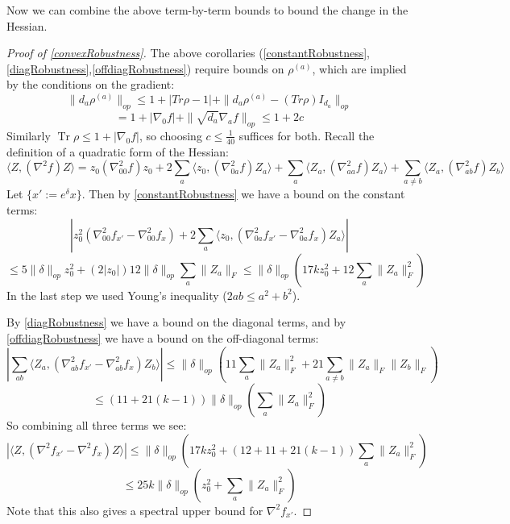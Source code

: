 \documentclass[aos]{imsart}
\theoremstyle{definition}
\numberwithin{equation}{section}
\DeclareMathOperator{\tr}{Tr}
\newcommand{\samp}{x}
\newcommand{\CF}[1]{{\color{purple}[CF: #1]}}
\newcommand{\AR}[1]{{\color{orange}[AR: #1]}}
\begin{document}
\begin{appendix}
Now we can combine the above term-by-term bounds to bound the change in the Hessian.

\begin{proof} [Proof of \cref{convexRobustness}]
The above corollaries (\ref{constantRobustness},\ref{diagRobustness},\ref{offdiagRobustness}) require bounds on $\rho^{(a)}$, which are implied by the conditions on the gradient:
\[ \|d_{a} \rho^{(a)}\|_{op} \leq 1 + |Tr \rho - 1| + \|d_{a} \rho^{(a)} - (Tr \rho) I_{d_{a}} \|_{op}    \]
\[ = 1 + |\nabla_{0} f| + \|\sqrt{d_{a}} \nabla_{a} f\|_{op} \leq 1 + 2c     \]
Similarly $\tr \rho \leq 1 + |\nabla_{0} f|$, so choosing $c \leq \frac{1}{40}$ suffices for both.
Recall the definition of a quadratic form of the Hessian:
\[ \langle Z, (\nabla^{2} f) Z \rangle = z_{0} (\nabla^{2}_{00} f) z_{0} + 2 \sum_{a} \langle z_{0}, (\nabla^{2}_{0a} f) Z_{a} \rangle + \sum_{a} \langle Z_{a}, (\nabla^{2}_{aa} f) Z_{a} \rangle + \sum_{a \neq b} \langle Z_{a}, (\nabla^{2}_{ab} f) Z_{b} \rangle     \]
Let $\{\samp' := e^{\delta} \samp\}$. Then by \cref{constantRobustness} we have a bound on the constant terms:
\[ | z_{0}^{2} (\nabla^{2}_{00} f_{\samp'} - \nabla^{2}_{00} f_{\samp} ) + 2 \sum_{a} \langle z_{0}, (\nabla^{2}_{0a} f_{\samp'} - \nabla^{2}_{0a} f_{\samp}) Z_{a} \rangle |      \]
\[ \leq 5 \|\delta\|_{op} z_{0}^{2} + (2 |z_{0}|) 12 \|\delta\|_{op} \sum_{a} \|Z_{a}\|_{F}
\leq \|\delta\|_{op} (17 k z_{0}^{2} + 12 \sum_{a} \|Z_{a}\|_{F}^{2})   \]
In the last step we used Young's inequality ($2ab \leq a^{2} + b^{2}$).

By \cref{diagRobustness} we have a bound on the diagonal terms, and by \cref{offdiagRobustness} we have a bound on the off-diagonal terms:
\[ |\sum_{ab} \langle Z_{a}, (\nabla^{2}_{ab} f_{\samp'} - \nabla^{2}_{ab} f_{\samp} ) Z_{b} \rangle | \leq \|\delta\|_{op} \left( 11 \sum_{a} \|Z_{a}\|_{F}^{2} + 21 \sum_{a \neq b} \|Z_{a}\|_{F} \|Z_{b}\|_{F} \right)   \]
\[ \leq (11 + 21(k-1)) \|\delta\|_{op} \left( \sum_{a} \|Z_{a}\|_{F}^{2} \right)   \]
So combining all three terms we see:
\[ |\langle Z, (\nabla^{2} f_{\samp'} - \nabla^{2} f_{\samp} ) Z \rangle | \leq \|\delta\|_{op} \left( 17 k z_{0}^{2} + (12 + 11 + 21 (k-1)) \sum_{a} \|Z_{a}\|_{F}^{2} \right)    \]
\[ \leq 25 k \|\delta\|_{op} \left( z_{0}^{2} + \sum_{a} \|Z_{a}\|_{F}^{2} \right)    \]
Note that this also gives a spectral upper bound for $\nabla^{2} f_{\samp'}$.
\end{proof}


\end{appendix}
\end{document}
